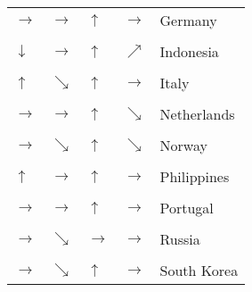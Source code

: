 \begin{table}[!h]
\begin{tabular}[t]{lllll}
$\rightarrow$ & $\rightarrow$ & $\uparrow$ & $\rightarrow$ & Germany\\
\cellcolor{gray!6}{$\rightarrow$} & \cellcolor{gray!6}{$\nearrow$} & \cellcolor{gray!6}{$\rightarrow$} & \cellcolor{gray!6}{$\nearrow$} & \cellcolor{gray!6}{India}\\
\addlinespace
$\downarrow$ & $\rightarrow$ & $\uparrow$ & $\nearrow$ & Indonesia\\
\cellcolor{gray!6}{$\uparrow$} & \cellcolor{gray!6}{$\rightarrow$} & \cellcolor{gray!6}{$\uparrow$} & \cellcolor{gray!6}{$\searrow$} & \cellcolor{gray!6}{Ireland}\\
$\uparrow$ & $\searrow$ & $\uparrow$ & $\rightarrow$ & Italy\\
\cellcolor{gray!6}{$\rightarrow$} & \cellcolor{gray!6}{$\rightarrow$} & \cellcolor{gray!6}{$\uparrow$} & \cellcolor{gray!6}{$\rightarrow$} & \cellcolor{gray!6}{Mexico}\\
$\rightarrow$ & $\rightarrow$ & $\uparrow$ & $\searrow$ & Netherlands\\
\addlinespace
\cellcolor{gray!6}{$\rightarrow$} & \cellcolor{gray!6}{$\searrow$} & \cellcolor{gray!6}{$\uparrow$} & \cellcolor{gray!6}{$\searrow$} & \cellcolor{gray!6}{New Zealand}\\
$\rightarrow$ & $\searrow$ & $\uparrow$ & $\searrow$ & Norway\\
\cellcolor{gray!6}{$\rightarrow$} & \cellcolor{gray!6}{$\rightarrow$} & \cellcolor{gray!6}{$\rightarrow$} & \cellcolor{gray!6}{$\nearrow$} & \cellcolor{gray!6}{Pakistan}\\
$\uparrow$ & $\rightarrow$ & $\uparrow$ & $\rightarrow$ & Philippines\\
\cellcolor{gray!6}{$\uparrow$} & \cellcolor{gray!6}{$\searrow$} & \cellcolor{gray!6}{$\uparrow$} & \cellcolor{gray!6}{$\rightarrow$} & \cellcolor{gray!6}{Poland}\\
\addlinespace
$\rightarrow$ & $\rightarrow$ & $\uparrow$ & $\rightarrow$ & Portugal\\
\cellcolor{gray!6}{$\uparrow$} & \cellcolor{gray!6}{$\searrow$} & \cellcolor{gray!6}{$\uparrow$} & \cellcolor{gray!6}{$\rightarrow$} & \cellcolor{gray!6}{Romania}\\
$\rightarrow$ & $\searrow$ & $\rightarrow$ & $\rightarrow$ & Russia\\
\cellcolor{gray!6}{$\rightarrow$} & \cellcolor{gray!6}{$\rightarrow$} & \cellcolor{gray!6}{$\uparrow$} & \cellcolor{gray!6}{$\rightarrow$} & \cellcolor{gray!6}{South Africa}\\
$\rightarrow$ & $\searrow$ & $\uparrow$ & $\rightarrow$ & South Korea\\

\end{tabular}
\end{table}
